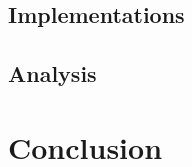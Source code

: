 \documentclass[defaultstyle,11pt]{thesis}
\begin{document}
\section{Implementations}
\section{Analysis}

%
\chapter{Conclusion}
\label{chap:conclusion}


\nocite{*}                %

\appendix
%
%
\end{document}
